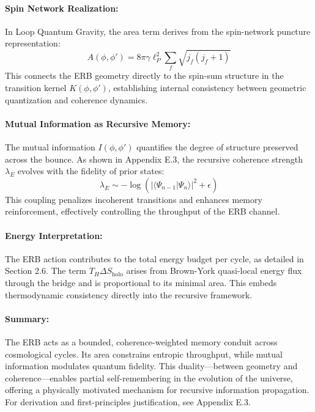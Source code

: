 \paragraph{Spin Network Realization:}

In Loop Quantum Gravity, the area term derives from the spin-network puncture representation:
\[
A(\phi, \phi') = 8\pi \gamma \ell_P^2 \sum_f \sqrt{j_f(j_f+1)}
\]
This connects the ERB geometry directly to the spin-sum structure in the transition kernel \( K(\phi, \phi') \), establishing internal consistency between geometric quantization and coherence dynamics.

\paragraph{Mutual Information as Recursive Memory:}

The mutual information \( I(\phi, \phi') \) quantifies the degree of structure preserved across the bounce. As shown in Appendix E.3, the recursive coherence strength \( \lambda_E \) evolves with the fidelity of prior states:
\[
\lambda_E \sim -\log \left( |\langle \Psi_{n-1} | \Psi_n \rangle|^2 + \epsilon \right)
\]
This coupling penalizes incoherent transitions and enhances memory reinforcement, effectively controlling the throughput of the ERB channel.

\paragraph{Energy Interpretation:}

The ERB action contributes to the total energy budget per cycle, as detailed in Section 2.6. The term \( T_H \Delta S_{\text{holo}} \) arises from Brown-York quasi-local energy flux through the bridge and is proportional to its minimal area. This embeds thermodynamic consistency directly into the recursive framework.

\paragraph{Summary:}

The ERB acts as a bounded, coherence-weighted memory conduit across cosmological cycles. Its area constrains entropic throughput, while mutual information modulates quantum fidelity. This duality—between geometry and coherence—enables partial self-remembering in the evolution of the universe, offering a physically motivated mechanism for recursive information propagation. For derivation and first-principles justification, see Appendix E.3.

